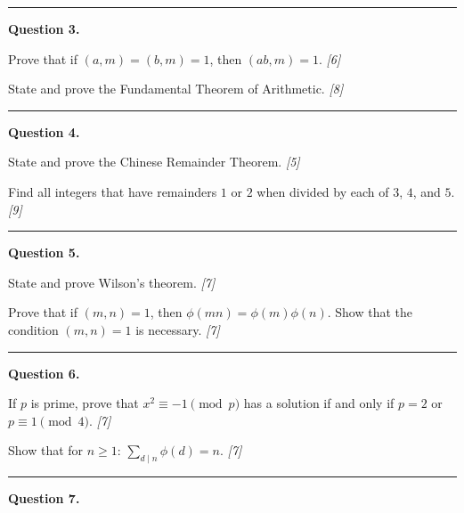 \documentclass[11pt,a4paper]{article}
\newcommand{\pts}[1]{\hfill   \textit{[#1]}}
\begin{document}
\medskip\rule{\linewidth}{0.2pt}

\medskip


\noindent   \textbf{Question 3.}

\begin{parts}
  \item Prove that if $(a,m) = (b,m) = 1$, then $(ab,m) = 1$. \pts{6}
  \item State and prove the Fundamental Theorem of Arithmetic. \pts{8}
\end{parts}

\medskip\rule{\linewidth}{0.2pt}

\medskip


\noindent   \textbf{Question 4.}

\begin{parts}
  \item State and prove the Chinese Remainder Theorem. \pts{5}
  \item Find all integers that have remainders $1$ or $2$ when divided by each of $3$, $4$, and $5$. \pts{9}
\end{parts}

\medskip\rule{\linewidth}{0.2pt}

\medskip


\noindent   \textbf{Question 5.}

\begin{parts}
  \item State and prove Wilson's theorem. \pts{7}
  \item Prove that if $(m,n) = 1$, then $\phi(mn) = \phi(m)\phi(n)$. Show that the condition $(m,n) = 1$ is necessary. \pts{7}
\end{parts}

\medskip\rule{\linewidth}{0.2pt}

\medskip


\noindent   \textbf{Question 6.}

\begin{parts}
  \item If $p$ is prime, prove that $x^2 \equiv -1 \pmod{p}$ has a solution if and only if $p = 2$ or $p \equiv 1 \pmod{4}$. \pts{7}
  \item Show that for $n \ge 1$: $\displaystyle\sum_{d \mid n} \phi(d) = n$. \pts{7}
\end{parts}

\medskip\rule{\linewidth}{0.2pt}

\medskip


\noindent   \textbf{Question 7.}
\end{document}
